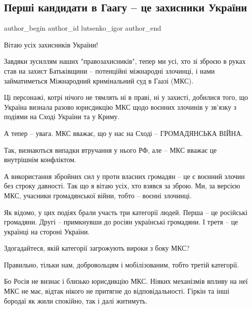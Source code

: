  
 
 
 
 
 
\subsection{Перші кандидати в Гаагу – це захисники України}
\label{sec:14_12_2020.news.ua.pravda.lutsenko_igor.1.gaaga_ukraina_defenders}
\ifcmt
	author_begin
   author_id lutsenko_igor
	author_end
\fi

Вітаю усіх захисників України!

Завдяки зусиллям наших "правозахисників", тепер ми усі, хто зі зброєю в руках
став на захист Батьківщини – потенційні міжнародні злочинці, і нами
займатиметься Міжнародний кримінальний суд в Гаазі (МКС).

Ці персонажі, котрі нічого не тямлять ні в праві, ні у захисті, добилися того,
що Україна визнала разово юрисдикцію МКС щодо воєнних злочинів у зв'язку з
подіями на Сході України та у Криму.

А тепер – увага. МКС вважає, що у нас на Сході – ГРОМАДЯНСЬКА ВІЙНА.

Так, визнаються випадки втручання у нього РФ, але – МКС вважає це внутрішнім
конфліктом.

А використання збройних сил у проти власних громадян – це є воєнний злочин без
строку давності. Так що я вітаю усіх, хто взявся за зброю. Ми, за версією МКС,
учасники громадянської війни, тобто – воєнні злочинці.

Як відомо, у цих подіях брали участь три категорії людей. Перша – це російські
громадяни. Другі – примкнувши до росіян українські громадяни. І третя – це
українці на стороні України.

Здогадайтеся, якій категорії загрожують вироки з боку МКС?

Правильно, тільки нам, добровольцям і мобілізованим, тобто третій категорії.

Бо Росія не визнає і близько юрисдикцію МКС. Ніяких механізмів впливу на неї
МКС не має, відтак нікого не притягне до відповідальності. Гіркін та інші
бородаї як жили спокійно, так і далі житимуть.

